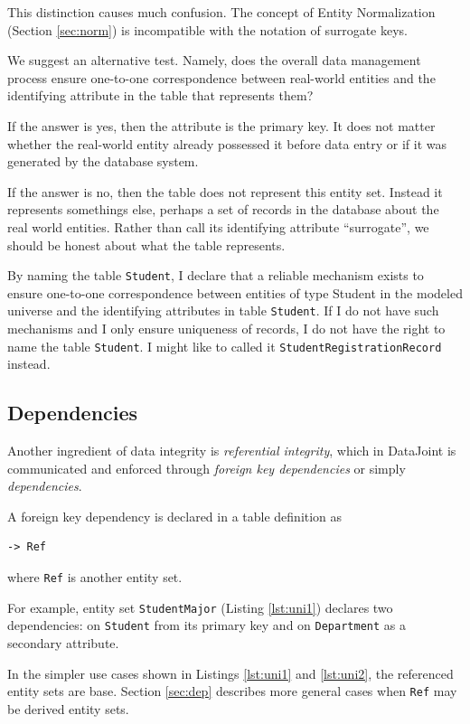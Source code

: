 \documentclass[letter,10pt]{article}
\begin{document}
This distinction causes much confusion.  The concept of Entity Normalization (Section \ref{sec:norm}) is incompatible with the notation of surrogate keys.

We suggest an alternative test. Namely, does the overall data management process  ensure one-to-one correspondence between real-world entities and the identifying attribute in the table that represents them?

If the answer is yes, then the attribute is the primary key. It does not matter whether the real-world entity already possessed it before data entry or if it was generated by the database system.

If the answer is no, then the table does not represent this entity set.  Instead it represents somethings else, perhaps a set of records in the database about the real world entities.  Rather than call its identifying attribute ``surrogate'', we should be honest about what the table represents. 

By naming the table \lstinline$Student$, I declare that a reliable mechanism exists to ensure one-to-one correspondence between entities of type Student in the modeled universe and the identifying attributes in table \lstinline$Student$.
If I do not have such mechanisms and I only ensure uniqueness of records, I do not have the right to name the table \lstinline$Student$.
I might like to called it \lstinline$StudentRegistrationRecord$ instead. 

\subsection{Dependencies}
Another ingredient of data integrity is \emph{referential integrity}, which in DataJoint is communicated and enforced through \emph{foreign key dependencies} or simply \emph{dependencies}.

A foreign key dependency is declared in a table definition as 
\begin{lstlisting}
-> Ref 
\end{lstlisting}
where \lstinline$Ref$ is another entity set.

For example, entity set \lstinline$StudentMajor$ (Listing \ref{lst:uni1}) declares two dependencies: on \lstinline$Student$ from its primary key and on \lstinline$Department$ as a secondary attribute.

In the simpler use cases shown in Listings \ref{lst:uni1} and \ref{lst:uni2}, the referenced entity sets are base. 
Section \ref{sec:dep} describes more general cases when \lstinline$Ref$ may be derived entity sets.
\end{document}

